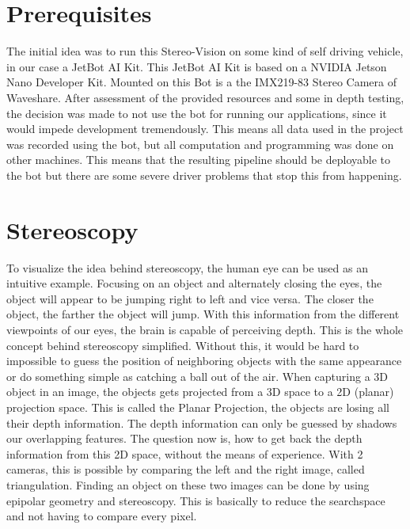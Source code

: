 \documentclass[journal,onecolumn]{IEEEtran}
\begin{document}
\section{Prerequisites}
\noindent The initial idea was to run this Stereo-Vision on some kind of self driving vehicle, in our case a JetBot AI Kit\cite{jetbot_wiki}. This JetBot AI Kit is based on a NVIDIA Jetson Nano Developer Kit\cite{nvidia_jetson}. Mounted on this Bot is a the IMX219-83 Stereo Camera\cite{cam_wiki} of Waveshare. After assessment of the provided resources and some in depth testing, the decision was made to not use the bot for running our applications, since it would impede development tremendously. This means all data used in the project was recorded using the bot, but all computation and programming was done on other machines. This means that the resulting pipeline should be deployable to the bot but there are some severe driver problems that stop this from happening.
\section{Stereoscopy}
\noindent
To visualize the idea behind stereoscopy, the human eye can be used as an intuitive example. Focusing on an object and alternately closing the eyes, the object will appear to be jumping right to left and vice versa. The closer the object, the farther the object will jump. With this information from the different viewpoints of our eyes, the brain is capable of perceiving depth. This is the whole concept behind stereoscopy simplified. Without this, it would be hard to impossible to guess the position of neighboring objects with the same appearance or do something simple as catching a ball out of the air.
When capturing a 3D object in an image, the objects gets projected from a 3D space to a 2D (planar) projection space. This is called the Planar Projection, the objects are losing all their depth information. The depth information can only be guessed by shadows our overlapping features. The question now is, how to get back the depth information from this 2D space, without the means of experience.
With 2 cameras, this is possible by comparing the left and the right image, called triangulation.
Finding an object on these two images can be done by using epipolar geometry and stereoscopy. This is basically to reduce the searchspace and not having to compare every pixel.
\end{document}
